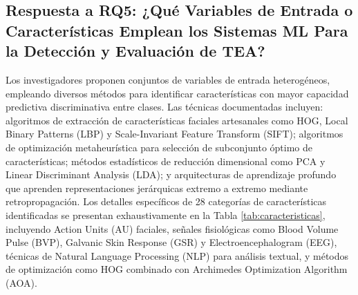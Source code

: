 \documentclass{ieeeaccess}
\begin{document}
	\subsection{Respuesta a RQ5: ¿Qué Variables de Entrada o Características Emplean los Sistemas ML Para la Detección y Evaluación de TEA?}
	
	Los investigadores proponen conjuntos de variables de entrada heterogéneos, empleando diversos métodos para identificar características con mayor capacidad predictiva discriminativa entre clases. Las técnicas documentadas incluyen: algoritmos de extracción de características faciales artesanales como HOG, Local Binary Patterns (LBP) y Scale-Invariant Feature Transform (SIFT); algoritmos de optimización metaheurística para selección de subconjunto óptimo de características; métodos estadísticos de reducción dimensional como PCA y Linear Discriminant Analysis (LDA); y arquitecturas de aprendizaje profundo que aprenden representaciones jerárquicas extremo a extremo mediante retropropagación. Los detalles específicos de 28 categorías de características identificadas se presentan exhaustivamente en la Tabla \ref{tab:caracteristicas}, incluyendo Action Units (AU) faciales, señales fisiológicas como Blood Volume Pulse (BVP), Galvanic Skin Response (GSR) y Electroencephalogram (EEG), técnicas de Natural Language Processing (NLP) para análisis textual, y métodos de optimización como HOG combinado con Archimedes Optimization Algorithm (AOA).
	
\end{document}
